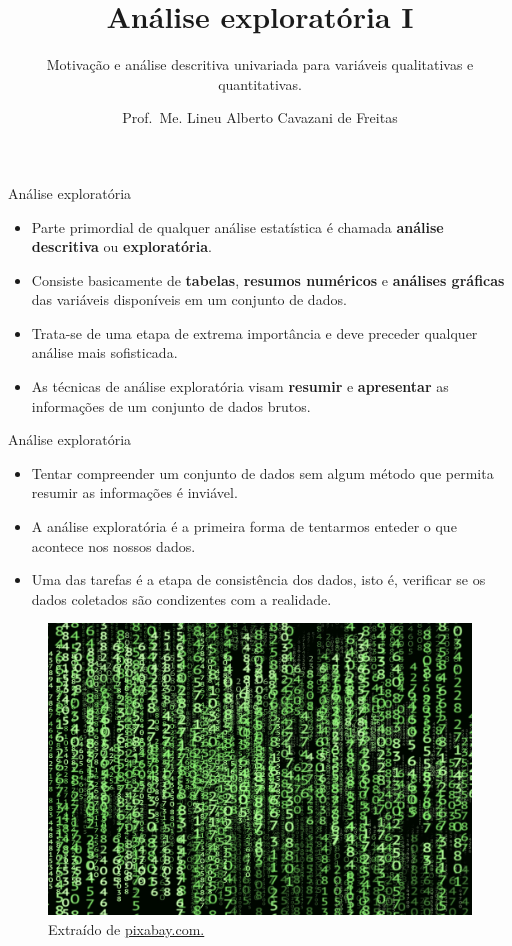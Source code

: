 \documentclass[
  ignorenonframetext,
  serif,
  professionalfont,
  usenames,
  dvipsnames,
  aspectratio = 169]{beamer}
\title{\textbf{Análise exploratória I}}
\subtitle{Motivação e análise descritiva univariada para variáveis
qualitativas e quantitativas.}
\author{Prof.~Me. Lineu Alberto Cavazani de Freitas}
\date{}
\institute{\textbf{CE003 – Estatística II}\\
\strut \\
Departamento de Estatística\\
Laboratório de Estatística e Geoinformação}
\def\beginAHalfColumn{\begin{minipage}{0.49\textwidth}}%
\def\endColumns{\end{minipage}}%
\begin{document}
\frame{\titlepage}

\begin{frame}{Análise exploratória}
\protect\hypertarget{anuxe1lise-exploratuxf3ria}{}
\begin{itemize}
\item
  Parte primordial de qualquer análise estatística é chamada
  \textbf{análise descritiva} ou \textbf{exploratória}.
\item
  Consiste basicamente de \textbf{tabelas}, \textbf{resumos numéricos} e
  \textbf{análises gráficas} das variáveis disponíveis em um conjunto de
  dados.
\item
  Trata-se de uma etapa de extrema importância e deve preceder qualquer
  análise mais sofisticada.
\item
  As técnicas de análise exploratória visam \textbf{resumir} e
  \textbf{apresentar} as informações de um conjunto de dados brutos.
\end{itemize}
\end{frame}

\begin{frame}{Análise exploratória}
\protect\hypertarget{anuxe1lise-exploratuxf3ria-1}{}
\beginAHalfColumn

\begin{itemize}
\item
  Tentar compreender um conjunto de dados sem algum método que permita
  resumir as informações é inviável.
\item
  A análise exploratória é a primeira forma de tentarmos enteder o que
  acontece nos nossos dados.
\item
  Uma das tarefas é a etapa de consistência dos dados, isto é, verificar
  se os dados coletados são condizentes com a realidade.
\end{itemize}

\endColumns
\beginAHalfColumn

\begin{figure}

{\centering \includegraphics[width=0.9\linewidth]{./img/dados} 

}

\caption{Extraído de \href{https://cdn.pixabay.com/photo/2018/01/26/18/21/matrix-3109378_1280.jpg}{pixabay.com.}}\label{fig:unnamed-chunk-2}
\end{figure}

\endColumns
\end{frame}
\end{document}

